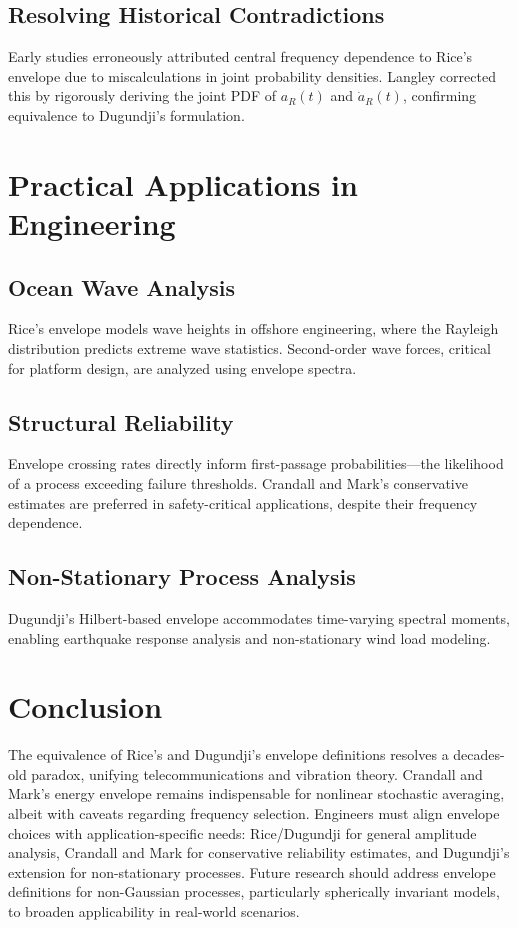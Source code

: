 \documentclass[12pt]{article}
\begin{document}
\subsection{Resolving Historical Contradictions}
Early studies erroneously attributed central frequency dependence to Rice’s envelope due to miscalculations in joint probability densities. Langley corrected this by rigorously deriving the joint PDF of $a_R(t)$ and $\dot{a}_R(t)$, confirming equivalence to Dugundji’s formulation.

\section{Practical Applications in Engineering}

\subsection{Ocean Wave Analysis}
Rice’s envelope models wave heights in offshore engineering, where the Rayleigh distribution predicts extreme wave statistics. Second-order wave forces, critical for platform design, are analyzed using envelope spectra.

\subsection{Structural Reliability}
Envelope crossing rates directly inform first-passage probabilities---the likelihood of a process exceeding failure thresholds. Crandall and Mark’s conservative estimates are preferred in safety-critical applications, despite their frequency dependence.

\subsection{Non-Stationary Process Analysis}
Dugundji’s Hilbert-based envelope accommodates time-varying spectral moments, enabling earthquake response analysis and non-stationary wind load modeling.

\section{Conclusion}
The equivalence of Rice’s and Dugundji’s envelope definitions resolves a decades-old paradox, unifying telecommunications and vibration theory. Crandall and Mark’s energy envelope remains indispensable for nonlinear stochastic averaging, albeit with caveats regarding frequency selection. Engineers must align envelope choices with application-specific needs: Rice/Dugundji for general amplitude analysis, Crandall and Mark for conservative reliability estimates, and Dugundji’s extension for non-stationary processes. Future research should address envelope definitions for non-Gaussian processes, particularly spherically invariant models, to broaden applicability in real-world scenarios.
\end{document}
